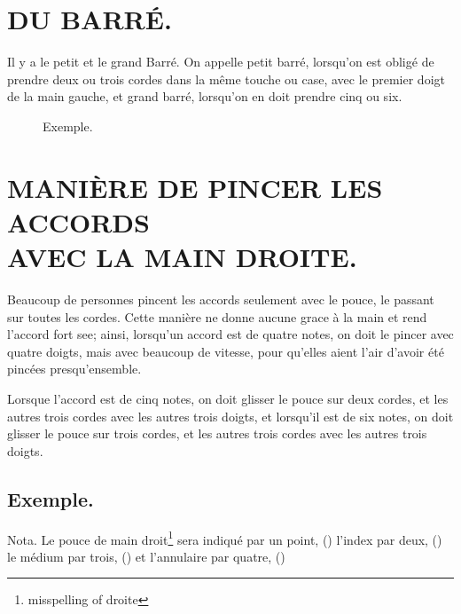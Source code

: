 \documentclass[a4paper]{book}
\begin{document}
\begin{figure}[h]
  \centering
\end{figure}

\chapter[Le petit et le grande Barré]{DU BARRÉ.}

Il y a le petit et le grand Barré.  On appelle petit barré, lorsqu'on est obligé de prendre deux ou trois cordes dans la même touche ou case, avec le premier doigt de la main gauche, et grand barré, lorsqu'on en doit prendre cinq ou six.

{
  \setlength{\intextsep}{0pt}
  \setlength{\abovecaptionskip}{-1ex}
  \begin{figure}[h]
    \centering
    \caption{Exemple.}
    \label{fig:barre}
  \end{figure}
}

\chapter[La manière de pincer les accords]{%
  MANIÈRE DE PINCER LES ACCORDS\\
  \footnotesize AVEC LA MAIN DROITE.}

Beaucoup de personnes pincent les accords seulement avec le pouce, le passant sur toutes les cordes.  Cette manière ne donne aucune grace à la main et rend l'accord fort see; ainsi, lorsqu'un accord est de quatre notes, on doit le pincer avec quatre doigts, mais avec beaucoup de vitesse, pour qu'elles aient l'air d'avoir été pincées presqu'ensemble.

Lorsque l'accord est de cinq notes, on doit glisser le pouce sur deux cordes, et les autres trois cordes avec les autres trois doigts, et lorsqu'il est de six notes, on doit glisser le pouce sur trois cordes, et les autres trois cordes avec les autres trois doigts.

\section*{Exemple.}

{\footnotesize Nota.}  Le pouce de main droit\footnote{misspelling of droite} sera indiqué par un point, (\raisebox{.2ex}{.}) l'index par deux, (\raisebox{.2ex}{..}) le médium par trois, (\raisebox{.2ex}{...}) et l'annulaire par quatre, (\raisebox{.2ex}{....})
\end{document}
